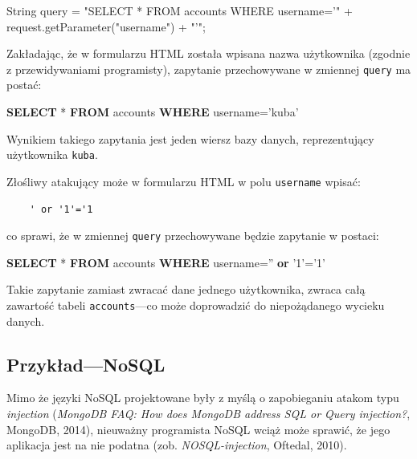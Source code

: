 \documentclass[12pt,polish,a4paper,]{report}
\newenvironment{Shaded}{}{}
\newcommand{\KeywordTok}[1]{\textcolor[rgb]{0.00,0.44,0.13}{\textbf{{#1}}}}
\newcommand{\StringTok}[1]{\textcolor[rgb]{0.25,0.44,0.63}{{#1}}}
\newcommand{\FunctionTok}[1]{\textcolor[rgb]{0.02,0.16,0.49}{{#1}}}
\newcommand{\NormalTok}[1]{{#1}}
\begin{document}
\begin{Shaded}
\begin{Highlighting}[]
\NormalTok{String query = }\StringTok{"SELECT * FROM accounts WHERE username='"}
     \NormalTok{+ request.}\FunctionTok{getParameter}\NormalTok{(}\StringTok{"username"}\NormalTok{) + }\StringTok{"'"}\NormalTok{;}
\end{Highlighting}
\end{Shaded}

Zakładając, że w formularzu HTML została wpisana nazwa użytkownika
(zgodnie z przewidywaniami programisty), zapytanie przechowywane w
zmiennej \texttt{query} ma postać:

\begin{Shaded}
\begin{Highlighting}[]
    \KeywordTok{SELECT} \NormalTok{* }\KeywordTok{FROM} \NormalTok{accounts }\KeywordTok{WHERE} \NormalTok{username=}\StringTok{'kuba'}
\end{Highlighting}
\end{Shaded}

Wynikiem takiego zapytania jest jeden wiersz bazy danych, reprezentujący
użytkownika \texttt{kuba}.

Złośliwy atakujący może w formularzu HTML w polu \texttt{username}
wpisać:

\begin{verbatim}
    ' or '1'='1
\end{verbatim}

co sprawi, że w zmiennej \texttt{query} przechowywane będzie zapytanie w
postaci:

\begin{Shaded}
\begin{Highlighting}[]
    \KeywordTok{SELECT} \NormalTok{* }\KeywordTok{FROM} \NormalTok{accounts }\KeywordTok{WHERE} \NormalTok{username=}\StringTok{''} \KeywordTok{or} \StringTok{'1'}\NormalTok{=}\StringTok{'1'}
\end{Highlighting}
\end{Shaded}

Takie zapytanie zamiast zwracać dane jednego użytkownika, zwraca całą
zawartość tabeli \texttt{accounts}---co może doprowadzić do
niepożądanego wycieku danych.

\subsection{Przykład---NoSQL}\label{przykux142adnosql}

Mimo że języki NoSQL projektowane były z myślą o zapobieganiu atakom
typu \emph{injection} (\emph{MongoDB FAQ: How does MongoDB address SQL
or Query injection?}, MongoDB, 2014), nieuważny programista NoSQL wciąż
może sprawić, że jego aplikacja jest na nie podatna (zob.
\emph{NOSQL-injection}, Oftedal, 2010).
\end{document}
